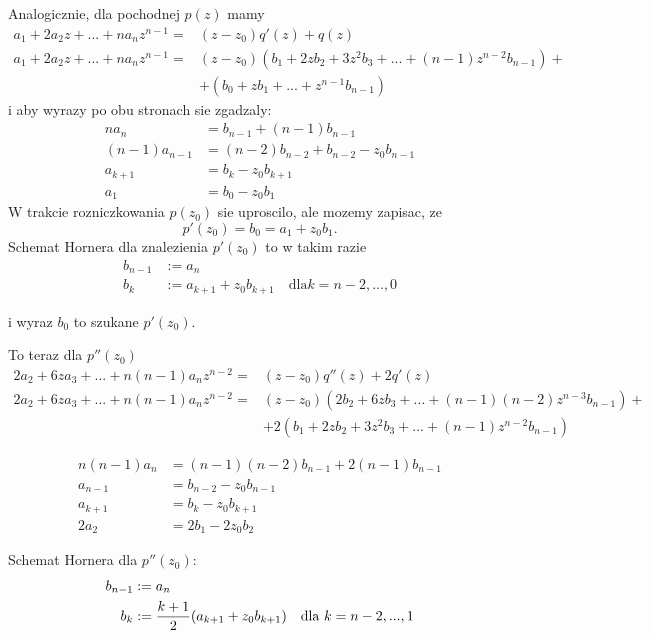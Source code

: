 \documentclass{article}[16pt]
\begin{document}
    Analogicznie, dla pochodnej $p(z)$ mamy
    \begin{align*}
        a_1+2a_2z+...+na_nz^{n-1}=&(z-z_0)q'(z)+q(z)\\
        a_1+2a_2z+...+na_nz^{n-1}=&(z-z_0)(b_1+2zb_2+3z^2b_3+...+(n-1)z^{n-2}b_{n-1})+\\
        &+(b_0+zb_1+...+z^{n-1}b_{n-1})
    \end{align*}
    i aby wyrazy po obu stronach sie zgadzaly:
    \begin{align*}
        na_n&=b_{n-1}+(n-1)b_{n-1}\\
        (n-1)a_{n-1}&=(n-2)b_{n-2}+b_{n-2}-z_0b_{n-1}\\
        a_{k+1}&=b_k-z_0b_{k+1}\\
        a_1&=b_0-z_0b_1
    \end{align*}
    W trakcie rozniczkowania $p(z_0)$ sie uproscilo, ale mozemy zapisac, ze
    $$p'(z_0)=b_0=a_1+z_0b_1.$$
    Schemat Hornera dla znalezienia $p'(z_0)$ to w takim razie
    \begin{align*}
        b_{n-1}&:=a_n\\
        b_k&:=a_{k+1}+z_0b_{k+1}\quad\text{dla}k=n-2,...,0
    \end{align*}

    i wyraz $b_0$ to szukane $p'(z_0)$.
    \medskip

    To teraz dla $p''(z_0)$
    \begin{align*}
        2a_2+6za_3+...+n(n-1)a_nz^{n-2}=&(z-z_0)q''(z)+2q'(z)\\
        2a_2+6za_3+...+n(n-1)a_nz^{n-2}=&(z-z_0)(2b_2+6zb_3+...+(n-1)(n-2)z^{n-3}b_{n-1})+\\
        &+2(b_1+2zb_2+3z^2b_3+...+(n-1)z^{n-2}b_{n-1})
    \end{align*}

    \begin{align*}
        n(n-1)a_n&=(n-1)(n-2)b_{n-1}+2(n-1)b_{n-1}\\
        a_{n-1}&=b_{n-2}-z_0b_{n-1}\\
        a_{k+1}&=b_{k}-z_0b_{k+1}\\
        2a_2&=2b_1-2z_0b_2
    \end{align*}

    Schemat Hornera dla $p''(z_0)$:
    \begin{align*}
        b_{n-1}&:=a_n\\
        b_k&:={k+1\over2}(a_{k+1}+z_0b_{k+1})\quad\text{dla }k=n-2,...,1
    \end{align*}
\end{document}
